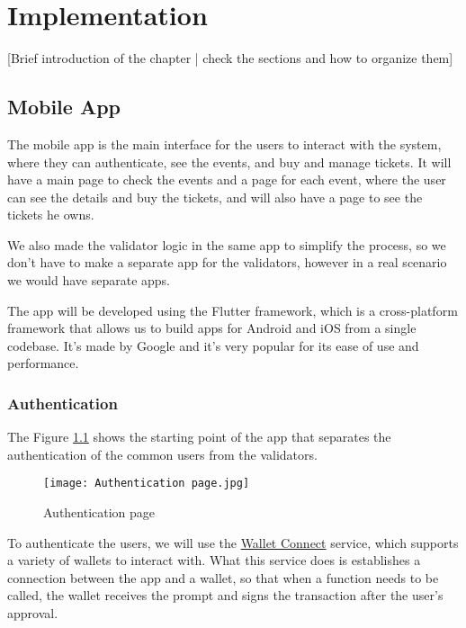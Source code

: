 \chapter{Implementation}
\label{ch:implementation}

[Brief introduction of the chapter | check the sections and how to organize them]

\section{Mobile App}
\label{sec:mobile_app}

The mobile app is the main interface for the users to interact with the system,
where they can authenticate, see the events, and buy and manage tickets. It
will have a main page to check the events and a page for each event, where the
user can see the details and buy the tickets, and will also have a page to see
the tickets he owns.

We also made the validator logic in the same app to simplify the process, so we
don't have to make a separate app for the validators, however in a real
scenario we would have separate apps.

The app will be developed using the Flutter framework, which is a
cross-platform framework that allows us to build apps for Android and iOS from
a single codebase. It's made by Google and it's very popular for its ease of
use and performance.

\subsection{Authentication}
\label{subsec:authentication}

The Figure \ref{fig:authentication_page} shows the starting point of the app
that separates the authentication of the common users from the validators.

\begin{figure}[H]
	\texttt{[image: Authentication page.jpg]}
	\centering
	\caption{Authentication page}
	\label{fig:authentication_page}
\end{figure}

To authenticate the users, we will use the
\href{https://walletconnect.com/}{Wallet Connect} service, which supports a
variety of wallets to interact with. What this service does is establishes a
connection between the app and a wallet, so that when a function needs to be
called, the wallet receives the prompt and signs the transaction after the
user's approval.

